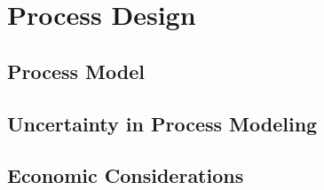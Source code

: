 \chapter{Process Design}
\label{chp:proces_design}

\section{Process Model}
\label{sec:process_model}

\section{Uncertainty in Process Modeling}
\label{sec:uncertainty}

\section{Economic Considerations}
\label{sec:uncertainty}


